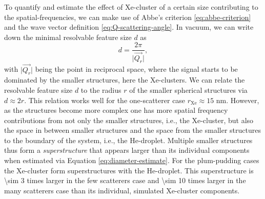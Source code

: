 %
To quantify and estimate the effect of Xe-cluster of a certain size contributing to the spatial-frequencies, we can make use of Abbe's criterion \eqref{eq:abbe-criterion} and the wave vector definition \eqref{eq:Q-scattering-angle}. In vacuum, we can write down the minimal resolvable feature size $d$ as
\begin{equation}
d = \frac{2\pi}{\lvert\vec{Q_{r}}\rvert},
\label{eq:diameter-estimate}
\end{equation}
with $\lvert\vec{Q_{r}}\rvert$ being the point in reciprocal space, where the signal starts to be dominated by the smaller structures, here the Xe-clusters. We can relate the resolvable feature size $d$ to the radius $r$ of the smaller spherical structures via $d\approx 2 r$. This relation works well for the one-scatterer case $r_{\text{Xe}}\approx 15$ nm. However, as the structures become more complex one has more spatial frequency contributions from not only the smaller structures, i.e., the Xe-cluster, but also the space in between smaller structures and the space from the smaller structures to the boundary of the system, i.e., the He-droplet. Multiple smaller structures thus form a \textit{superstructure} that appears larger than its individual components when estimated via Equation \eqref{eq:diameter-estimate}. For the plum-pudding cases the Xe-cluster form superstructures with the He-droplet. This superstructure is \num{\sim 3} times larger in the few scatterers case and \num{\sim 10} times larger in the many scatterers case than its individual, simulated Xe-cluster components.\\[1\baselineskip]
